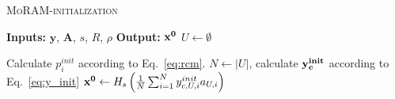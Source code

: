 \begin{algorithm}[t]
	\caption{\textsc{MoRAM-initialization}}
	\label{alg:RCM}
	\begin{algorithmic}
		\State\textbf{Inputs:} $\mathbf{y}$, $\mathbf{A}$, $s$, $R$, $\rho$
		\State\textbf{Output:}  $\mathbf{x^0}$
		\State $U \leftarrow \emptyset$%
%		
		
		\EndIf
		\State Calculate $p^{init}_i$ according to Eq.~\ref{eq:rcm}.
		\EndFor
		\State $N \leftarrow |U|$, calculate $\mathbf{y^{init}_c}$ according to Eq.~\ref{eq:y_init}
		\State $\mathbf{x^0} \leftarrow H_s\left( \frac{1}{N}\sum_{i=1}^{N}y^{init}_{c,U,i}a_{U,i}\right)$
	\end{algorithmic}
\end{algorithm}
